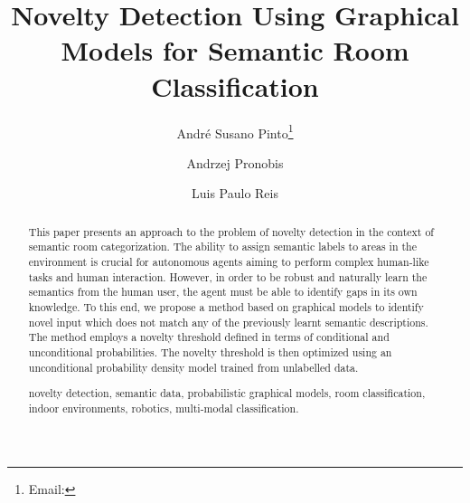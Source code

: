 \documentclass[runningheads,a4paper]{llncs}
\newcommand{\keywords}[1]{\par\addvspace\baselineskip
\noindent\keywordname\enspace\ignorespaces#1}
\begin{document}
\mainmatter  %

\title{Novelty Detection Using Graphical Models for Semantic Room Classification}


%
\author{André Susano Pinto\thanks{Email: } \and Andrzej Pronobis \and Luis Paulo Reis}
%


\maketitle


\begin{abstract}
This paper presents an approach to the problem of novelty
detection in the context of semantic room categorization.
The ability to assign semantic labels to areas in the environment is crucial for
autonomous agents aiming to perform complex human-like tasks and human
interaction.
However, in order to be robust and naturally learn the semantics from
the human user, the agent must be able to identify gaps in its own knowledge.
To this end, we propose a method based on graphical models to identify novel
input which does not match any of the previously learnt semantic descriptions.
The method employs a novelty threshold defined in terms of conditional
and unconditional probabilities. The novelty threshold is then optimized using
an unconditional probability density model trained from unlabelled data.


\keywords{novelty detection, semantic data, probabilistic graphical models,
room classification, indoor environments, robotics, multi-modal classification.}
\end{abstract}
\end{document}
